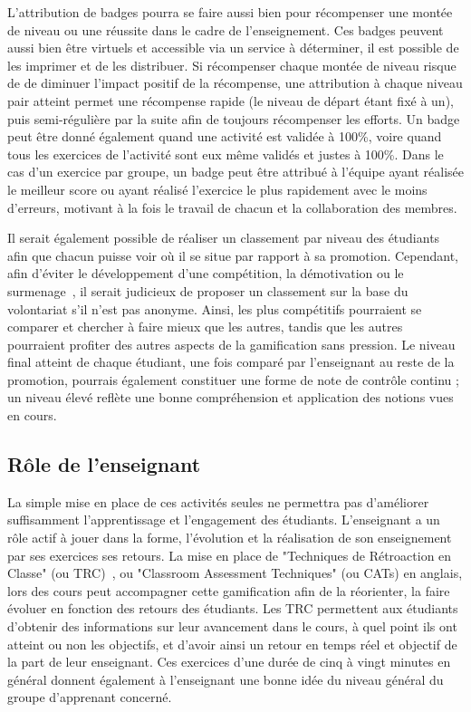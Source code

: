L'attribution de badges pourra se faire aussi bien pour récompenser une montée de niveau ou une réussite dans le cadre de l'enseignement. Ces badges peuvent aussi bien être virtuels et accessible via un service à déterminer, il est possible de les imprimer et de les distribuer. Si récompenser chaque montée de niveau risque de de diminuer l'impact positif de la récompense, une attribution à chaque niveau pair atteint permet une récompense rapide (le niveau de départ étant fixé à un), puis semi-régulière par la suite afin de toujours récompenser les efforts. Un badge peut être donné également quand une activité est validée à 100\%, voire quand tous les exercices de l'activité sont eux même validés et justes à 100\%. Dans le cas d'un exercice par groupe, un badge peut être attribué à l'équipe ayant réalisée le meilleur score ou ayant réalisé l'exercice le plus rapidement avec le moins d'erreurs, motivant à la fois le travail de chacun et la collaboration des membres. \par

Il serait également possible de réaliser un classement par niveau des étudiants afin que chacun puisse voir où il se situe par rapport à sa promotion. Cependant,  afin d'éviter le développement d'une compétition, la démotivation ou le surmenage~\cite{gamif-educ}, il serait judicieux de proposer un classement sur la base du volontariat s'il n'est pas anonyme. Ainsi, les plus compétitifs pourraient se comparer et chercher à faire mieux que les autres, tandis que les autres pourraient profiter des autres aspects de la gamification sans pression. Le niveau final atteint de chaque étudiant, une fois comparé par l'enseignant au reste de la promotion, pourrais également constituer une forme de note de contrôle continu ; un niveau élevé reflète une bonne compréhension et application des notions vues en cours.

\subsection{Rôle de l'enseignant}
La simple mise en place de ces activités seules ne permettra pas d'améliorer suffisamment l'apprentissage et l'engagement des étudiants. L'enseignant a un rôle actif à jouer dans la forme, l'évolution et la réalisation de son enseignement par ses exercices ses retours. La mise en place de "Techniques de Rétroaction en Classe" (ou TRC)~\cite{gamif-CATs}, ou "Classroom Assessment Techniques" (ou CATs) en anglais, lors des cours peut accompagner cette gamification afin de la réorienter, la faire évoluer en fonction des retours des étudiants. Les TRC permettent aux étudiants d'obtenir des informations sur leur avancement dans le cours, à quel point ils ont atteint ou non les objectifs, et d'avoir ainsi un retour en temps réel et objectif de la part de leur enseignant. Ces exercices d'une durée de cinq à vingt minutes en général donnent également à l'enseignant une bonne idée du niveau général du groupe d'apprenant concerné. \par

